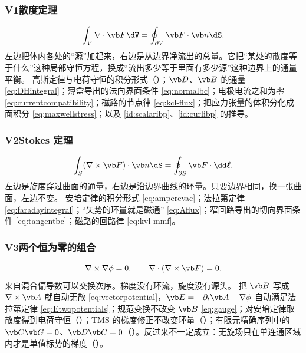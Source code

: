 \subsubsection{V1\quad 散度定理}
\begin{equation*}
\int_V\nabla\cdot\vb F\dV=\oint_{\partial V}\vb F\cdot\vb n\dS .
\end{equation*}
左边把体内各处的“源”加起来，右边是从边界净流出的总量。它把“某处的散度等于什么”这种局部守恒方程，换成“流出多少等于里面有多少源”这种边界上的通量平衡。
{高斯定律与电荷守恒的积分形式（）；$\vb D$、$\vb B$ 的通量 \eqref{eq:DHintegral}；薄盒导出的法向界面条件 \eqref{eq:normalbc}；电极电流之和为零 \eqref{eq:currentcompatibility}；磁路的节点律 \eqref{eq:kcl-flux}；把应力张量的体积分化成面积分 \eqref{eq:maxwellstress}；以及 \eqref{id:scalaribp}、\eqref{id:curlibp} 的推导。}

\subsubsection{V2\quad Stokes 定理}
\begin{equation*}
\int_S(\nabla\times\vb F)\cdot\vb n\dS=\oint_{\partial S}\vb F\cdot\dd\boldsymbol\ell .
\end{equation*}
左边是旋度穿过曲面的通量，右边是沿边界曲线的环量。只要边界相同，换一张曲面，左边不变。
{安培定律的积分形式 \eqref{eq:amperevac}；法拉第定律 \eqref{eq:faradayintegral}；“矢势的环量就是磁通” \eqref{eq:Aflux}；窄回路导出的切向界面条件 \eqref{eq:tangentbc}；磁路的回路律 \eqref{eq:kvl-mmf}。}

\subsubsection{V3\quad 两个恒为零的组合}
\begin{equation*}
\nabla\times\nabla\phi=0,\qquad \nabla\cdot(\nabla\times\vb F)=0 .
\end{equation*}
来自混合偏导数可以交换次序。梯度没有环流，旋度没有源头。
{把 $\vb B$ 写成 $\nabla\times\vb A$ 就自动无散 \eqref{eq:vectorpotential}，$\vb E=-\partial_t\vb A-\nabla\phi$ 自动满足法拉第定律 \eqref{eq:Etwopotentials}；规范变换不改变 $\vb B$ \eqref{eq:gauge}；对安培定律取散度得到电荷守恒（）；TMS 的梯度修正不改变环量（）；有限元精确序列中的 $\vb C\vb G=0$、$\vb D\vb C=0$（）。反过来不一定成立：无旋场只在单连通区域内才是单值标势的梯度（）。}

